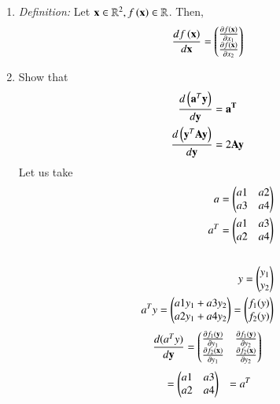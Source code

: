 \documentclass[journal,12pt,twocolumn]{IEEEtran}
\renewcommand\thesection{\arabic{section}}
\begin{document}
\begin{enumerate}[label=\thesection.\arabic*.,ref=\thesection.\theenumi]
\item {\em Definition: }Let $\mathbf{x} \in \mathbb{R}^2, f\left(\mathbf{x}\right) \in \mathbb{R}$.  Then, 
\begin{align}
\frac{df\left(\mathbf{x}\right)}{d\mathbf{x}} = \begin{pmatrix}\frac{\partial f(\mathbf{x})}{\partial x_1}\\\frac{\partial f(\mathbf{x})}{\partial x_2}\end{pmatrix}
\end{align}
\item Show that 
\begin{align}
\begin{split}
\frac{d\left(\mathbf{a}^T\mathbf{y}\right)}{d\mathbf{y}} &= \mathbf{a^T}
\\
\frac{d\left(\mathbf{y}^T\mathbf{A}\mathbf{y}\right)}{d\mathbf{y}} &= 2\mathbf{A}\mathbf{y}
\end{split}
\label{eq:calc_vec_diff}
\end{align}
\solution
Let us take
\begin{align*}
 a = \begin{pmatrix}a1 & a2 \\ a3 & a4\end{pmatrix}
\\
	a^T = \begin{pmatrix}a1 & a3 \\ a2 & a4\end{pmatrix}
\\
\\ y = \begin{pmatrix}y_1 \\ y_2\end{pmatrix}
\\
a^Ty = \begin{pmatrix}a1y_1+a3y_2 \\ a2y_1+a4y_2\end{pmatrix} = \begin{pmatrix}f_1(y) \\ f_2(y)\end{pmatrix}
\\
\end{align*}
\begin{align*}
\frac{d(a^Ty)}{d\mathbf{y}} = \begin{pmatrix}\frac{\partial f_1(\mathbf{y})}{\partial y_1} & \frac{\partial f_1(\mathbf{y})}{\partial y_2}\\ \frac{\partial f_2(\mathbf{x})}{\partial y_1} & \frac{\partial f_2(\mathbf{x})}{\partial y_2}\end{pmatrix}
\end{align*}	
\begin{align*}
&= \myvec{a1 & a3 \\ a2 & a4}
&= a^T \\ 

\end{align*}
\end{enumerate}
\end{document}
